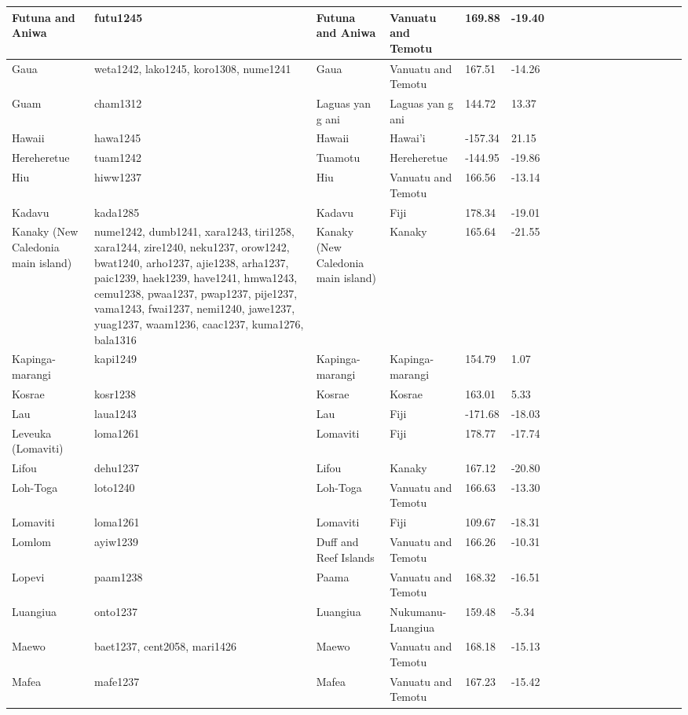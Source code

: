 \documentclass[draft,10pt]{article} %
\begin{document}
\begin{landscape}
\begin{longtable}{| p{2.5cm} |  p{7cm} | p{2.5cm}  | p{2.5cm}  | p{2.5cm}  | p{2.5cm}  | p{2.5cm}  | p{2cm}  | p{1cm} | p{1cm}  | p{1cm} | p{1cm}  | p{1.5cm}  | p{1cm} | p{1cm}  | p{1cm}  |p{1cm}  | p{1cm}    |}
 Futuna and Aniwa & futu1245 & Futuna and Aniwa & Vanuatu and Temotu & 169.88 & -19.40 \\ \hline
 Gaua & weta1242, lako1245, koro1308, nume1241 & Gaua & Vanuatu and Temotu & 167.51 & -14.26 \\ \hline
 Guam & cham1312 & Laguas yan g ani & Laguas yan g ani & 144.72 & 13.37 \\ \hline
 Hawaii & hawa1245 & Hawaii & Hawai'i & -157.34 & 21.15 \\ \hline
 Hereheretue & tuam1242 & Tuamotu & Hereheretue & -144.95 & -19.86 \\ \hline
 Hiu & hiww1237 & Hiu & Vanuatu and Temotu & 166.56 & -13.14 \\ \hline
 Kadavu & kada1285 & Kadavu & Fiji & 178.34 & -19.01 \\ \hline
 Kanaky (New Caledonia main island) & nume1242, dumb1241, xara1243, tiri1258, xara1244, zire1240, neku1237, orow1242, bwat1240, arho1237, ajie1238, arha1237, paic1239, haek1239, have1241, hmwa1243, cemu1238, pwaa1237, pwap1237, pije1237, vama1243, fwai1237, nemi1240, jawe1237, yuag1237, waam1236, caac1237, kuma1276, bala1316 & Kanaky (New Caledonia main island) & Kanaky & 165.64 & -21.55 \\ \hline
 Kapinga- marangi & kapi1249 & Kapinga- marangi & Kapinga- marangi & 154.79 & 1.07 \\ \hline
 Kosrae & kosr1238 & Kosrae & Kosrae & 163.01 & 5.33 \\ \hline
 Lau & laua1243 & Lau & Fiji & -171.68 & -18.03 \\ \hline
 Leveuka (Lomaviti) & loma1261 & Lomaviti & Fiji & 178.77 & -17.74 \\ \hline
 Lifou & dehu1237 & Lifou & Kanaky & 167.12 & -20.80 \\ \hline
 Loh-Toga & loto1240 & Loh-Toga & Vanuatu and Temotu & 166.63 & -13.30 \\ \hline
 Lomaviti & loma1261 & Lomaviti & Fiji & 109.67 & -18.31 \\ \hline
 Lomlom & ayiw1239 & Duff and Reef Islands & Vanuatu and Temotu & 166.26 & -10.31 \\ \hline
 Lopevi & paam1238 & Paama & Vanuatu and Temotu & 168.32 & -16.51 \\ \hline
 Luangiua & onto1237 & Luangiua & Nukumanu-Luangiua & 159.48 & -5.34 \\ \hline
 Maewo & baet1237, cent2058, mari1426 & Maewo & Vanuatu and Temotu & 168.18 & -15.13 \\ \hline
 Mafea & mafe1237 & Mafea & Vanuatu and Temotu & 167.23 & -15.42 \\ \hline

\end{longtable}
\end{landscape}
\end{document}
